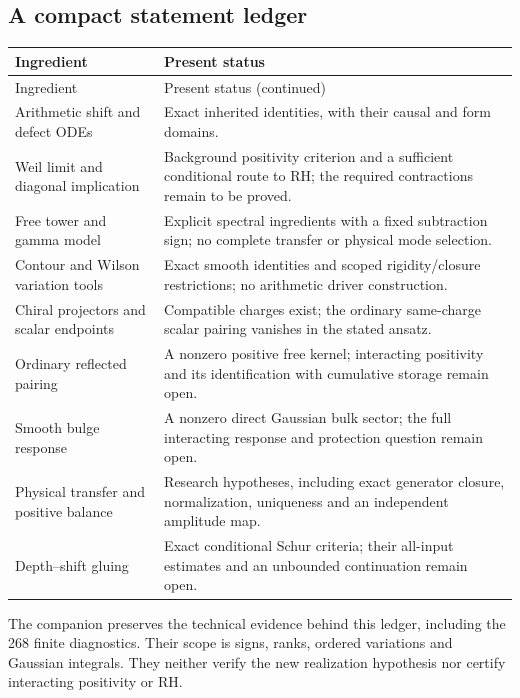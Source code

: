 \subsection{A compact statement ledger}

\renewcommand{\arraystretch}{1.13}
\begin{longtable}{@{}p{}p{}@{}}
\toprule
Ingredient & Present status\\
\midrule
\endfirsthead
\toprule
Ingredient & Present status (continued)\\
\midrule
\endhead
\bottomrule
\endfoot
Arithmetic shift and defect ODEs &
Exact inherited identities, with their causal and form domains.\\
Weil limit and diagonal implication &
Background positivity criterion and a sufficient conditional route
to RH; the required contractions remain to be proved.\\
Free tower and gamma model &
Explicit spectral ingredients with a fixed subtraction sign;
no complete transfer or physical mode selection.\\
Contour and Wilson variation tools &
Exact smooth identities and scoped rigidity/closure restrictions;
no arithmetic driver construction.\\
Chiral projectors and scalar endpoints &
Compatible charges exist; the ordinary same-charge scalar
pairing vanishes in the stated ansatz.\\
Ordinary reflected pairing &
A nonzero positive free kernel; interacting positivity and its
identification with cumulative storage remain open.\\
Smooth bulge response &
A nonzero direct Gaussian bulk sector; the full interacting
response and protection question remain open.\\
Physical transfer and positive balance &
Research hypotheses, including exact generator closure,
normalization, uniqueness and an independent amplitude map.\\
Depth--shift gluing &
Exact conditional Schur criteria; their all-input estimates
and an unbounded continuation remain open.\\
\end{longtable}
\renewcommand{\arraystretch}{1}

The companion preserves the technical evidence behind this ledger,
including the 268 finite diagnostics. Their scope is signs, ranks,
ordered variations and Gaussian integrals. They neither verify the
new realization hypothesis nor certify interacting positivity or RH.
